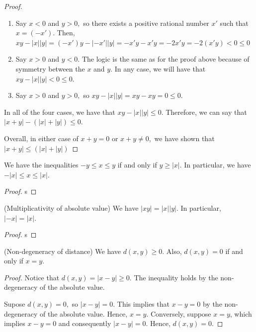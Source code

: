 \begin{proof}
\begin{enumerate}
\begin{enumerate}
        Then $xy - \lvert x \rvert \lvert y \rvert = (-x')(-y') - \lvert -x' \rvert \lvert -y' \rvert = x'y' - x'y' = 0 \leq 0.$
        \item Say $x < 0$ and $y > 0,$ so there exists a positive rational number $x'$ such that $x = (-x').$
        Then, $xy - \lvert x \rvert \lvert y \rvert = (-x')y - \lvert -x' \rvert \lvert y \rvert = -x'y -x'y = -2x'y = -2 (x'y) < 0 \leq 0$
        \item Say $x > 0$ and $y <0$. The logic is the same as for the proof above because of symmetry between the $x$ and $y$. In any case, we will have that $xy - \lvert x \rvert \lvert y \rvert < 0 \leq 0$.
        \item Say $x > 0$ and $y > 0,$ so $xy - \lvert x \rvert \lvert y \rvert = xy - xy = 0 \leq 0.$
    \end{enumerate} 
    
    In all of the four cases, we have that $xy - \lvert x \rvert \lvert y \rvert \leq  0.$ 
    Therefore, we can say that $\lvert x + y \rvert - (\lvert x \rvert + \lvert y \rvert) \leq 0$.
    \end{enumerate}
    Overall, in either case of $x + y = 0$ or $x + y \neq 0,$ we have shown that $\lvert x + y \rvert \leq (\lvert x \rvert + \lvert y \rvert)$
\end{proof}

\begin{proposition}
    We have the inequalities $-y \leq x \leq y$ if and only if $y \geq \lvert x \rvert.$
    In particular, we have $-\lvert x \rvert \leq x \leq \lvert x \rvert$.
\end{proposition}
\begin{proof}
    s
\end{proof}

\begin{proposition}
    (Multiplicativity of absolute value) We have $\lvert xy \rvert = \lvert x \rvert \lvert y \rvert.$ 
    In particular, $\lvert -x \rvert = \lvert x \rvert.$
\end{proposition}
\begin{proof}
    s
\end{proof}

\begin{proposition}
    (Non-degeneracy of distance) We have $d(x, y) \geq 0.$
    Also, $d(x, y) = 0$ if and only if $x = y.$
\end{proposition}
\begin{proof}
    Notice that $d(x, y) = \lvert x - y \rvert \geq 0.$ The inequality holds by the non-degeneracy of the absolute value.
    
    Supose $d(x, y) = 0,$ so $\lvert x - y \rvert = 0.$ 
    This implies that $x - y = 0$ by the non-degeneracy of the absolute value.
    Hence, $x = y$. 
    Conversely, suppose $x = y$, which implies $x - y = 0$ and consequently $|x - y| = 0.$
    Hence, $d(x, y) = 0.$
\end{proof}

